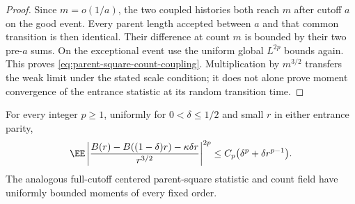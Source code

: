 \documentclass[11pt,letterpaper]{article}
\begin{document}
\begin{proof}
Since $m=o(1/a)$, the two coupled histories both reach $m$
after cutoff $a$ on the good event. Every parent length accepted
between $a$ and that common transition is then identical.
Their difference at count $m$ is bounded by their two pre-$a$
sums. On the exceptional event use the uniform global
$L^{2p}$ bounds again. This proves
\eqref{eq:parent-square-count-coupling}. Multiplication by
$m^{3/2}$ transfers the weak limit under the stated scale
condition; it does not alone prove moment convergence of the
entrance statistic at its random transition time.
\end{proof}

\begin{lemma}
\label{lem:parent-band-higher-moments}
For every integer $p\ge1$, uniformly for $0<\delta\le1/2$ and
small $r$ in either entrance parity,
\begin{equation}\label{eq:parent-band-higher-moments}
 \EE\left|\frac{B(r)-B((1-\delta)r)-\kappa\delta r}
                         {r^{3/2}}\right|^{2p}
       \le C_p\bigl(\delta^p+\delta r^{p-1}\bigr).
\end{equation}
The analogous full-cutoff centered parent-square statistic and
count field have uniformly bounded moments of every fixed order.
\end{lemma}
\end{document}
